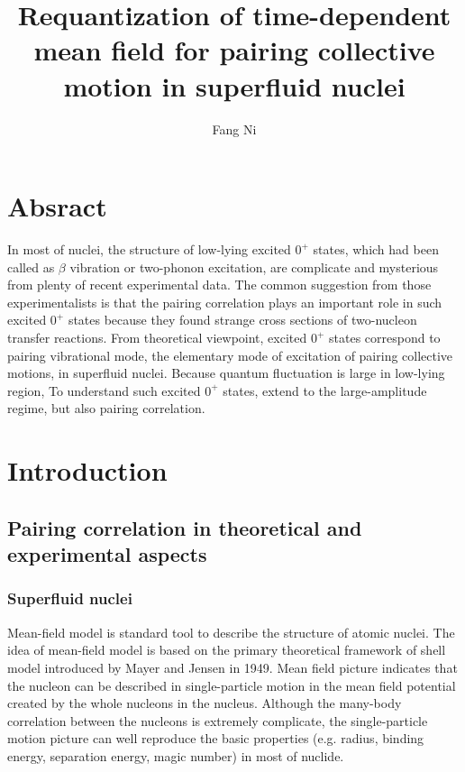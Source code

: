 \documentclass[11pt]{book} %
\title{Requantization of time-dependent mean field
 for pairing collective motion in superfluid nuclei}
\author{Fang Ni}
\begin{document}
\maketitle

\chapter*{Absract}

In most of nuclei, the structure of low-lying excited $0^+$ states, which had been called as $\beta$ vibration or two-phonon excitation, are complicate and mysterious from plenty of recent experimental data. The common suggestion from those experimentalists is that the pairing correlation plays an important role in such excited $0^+$ states because they found strange cross sections of two-nucleon transfer reactions. From theoretical viewpoint, excited $0^+$ states correspond to pairing vibrational mode, the elementary mode of excitation of pairing collective motions, in superfluid nuclei. 
Because quantum fluctuation is large in low-lying region, To understand such excited $0^+$ states, extend to the large-amplitude regime, but also pairing correlation. 




\tableofcontents
\thispagestyle{empty}

\chapter{Introduction}

\section{Pairing correlation in theoretical and experimental aspects}

\subsection{Superfluid nuclei}

Mean-field model is standard tool to describe the structure of atomic nuclei. The idea of mean-field model is based on the primary theoretical framework of shell model introduced by Mayer and Jensen in 1949. Mean field picture indicates that the nucleon can be described in single-particle motion in the mean field potential created by the whole nucleons in the nucleus. Although the many-body correlation between the nucleons is extremely complicate, the single-particle motion picture can well reproduce the basic properties (e.g. radius, binding energy, separation energy, magic number) in most of nuclide. %
\end{document}
